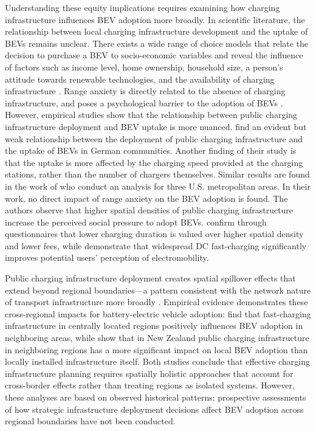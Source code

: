            Understanding these equity implications requires examining how charging infrastructure influences \ac{BEV} adoption more broadly. In scientific literature, the relationship between local charging infrastructure development and the uptake of \acp{BEV} remains unclear. There exists a wide range of choice models that relate the decision to purchase a \ac{BEV} to socio-economic variables and reveal the influence of factors such as income level, home ownership, household size, a person's attitude towards renewable technologies, and the availability of charging infrastructure \citep{AUSTMANN2021101846, Liu2020}.  Range anxiety is directly related to the absence of charging infrastructure, and poses a psychological barrier to the adoption of \acp{BEV} \cite{RAINIERI202352}. However, empirical studies show that the relationship between public charging infrastructure deployment and \ac{BEV} uptake is more nuanced. \citet{Illmann2020} find an evident but weak relationship between the deployment of public charging infrastructure and the uptake of \acp{BEV} in German communities. Another finding of their study is that the uptake is more affected by the charging speed provided at the charging stations, rather than the number of chargers themselves. Similar results are found in the work of \citet{WHITE2022102663} who conduct an analysis for three U.S. metropolitan areas. In their work, no direct impact of range anxiety on the \ac{BEV} adoption is found. The authors observe that higher spatial densities of public charging infrastructure increase the perceived social pressure to adopt \acp{BEV}. \citet{Globisch2019} confirm through questionnaires that lower charging duration is valued over higher spatial density and lower fees, while \citet{Gebauer2016} demonstrate that widespread DC fast-charging significantly improves potential users' perception of electromobility.

            Public charging infrastructure deployment creates spatial spillover effects that extend beyond regional boundaries—a pattern consistent with the network nature of transport infrastructure more broadly \citep{Shevtsova31122025, SPORKMANN2023103851, MONTOLIO200999}. Empirical evidence demonstrates these cross-regional impacts for battery-electric vehicle adoption: \citet{QIAN2024104400} find that fast-charging infrastructure in centrally located regions positively influences \ac{BEV} adoption in neighboring areas, while \citet{SELENASHENG2022103256} show that in New Zealand public charging infrastructure in neighboring regions has a more significant impact on local \ac{BEV} adoption than locally installed infrastructure itself. Both studies conclude that effective charging infrastructure planning requires spatially holistic approaches that account for cross-border effects rather than treating regions as isolated systems. However, these analyses are based on observed historical patterns; prospective assessments of how strategic infrastructure deployment decisions affect \ac{BEV} adoption across regional boundaries have not been conducted.

